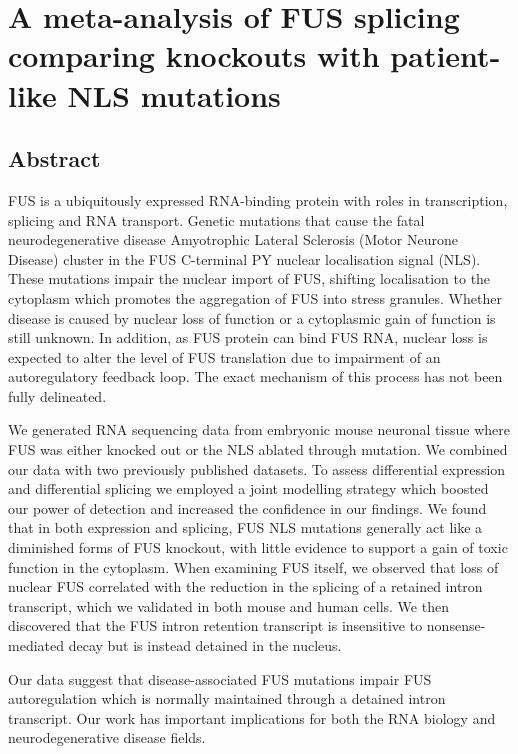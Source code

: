 \chapter{A meta-analysis of FUS splicing comparing knockouts with patient-like NLS mutations}
\label{chapter:fus_meta}

\section{Abstract}

FUS is a ubiquitously expressed RNA-binding protein with roles in transcription, splicing and RNA transport. Genetic mutations that cause the fatal neurodegenerative disease Amyotrophic Lateral Sclerosis (Motor Neurone Disease) cluster in the FUS C-terminal PY nuclear localisation signal (NLS).  These mutations impair the nuclear import of FUS,  shifting localisation to the cytoplasm which promotes the aggregation of FUS into stress granules. Whether disease is caused by nuclear loss of function or  a cytoplasmic gain of function is still unknown. In addition, as FUS protein can bind FUS RNA, nuclear loss is expected to alter the level of FUS translation due to impairment of an autoregulatory feedback loop. The exact mechanism of this process has not been fully delineated.

We generated RNA sequencing data from embryonic mouse neuronal tissue where FUS was either knocked out or the NLS ablated through mutation. We combined our data with two previously published datasets. To assess differential expression and differential splicing we employed a joint modelling strategy which boosted our power of detection and increased the confidence in our findings. We found that in both expression and splicing, FUS NLS mutations generally act like a diminished forms of FUS knockout, with little evidence to support a gain of toxic function in the cytoplasm. When examining FUS itself, we observed that loss of nuclear FUS correlated with the reduction in the splicing of a retained intron transcript, which we validated in both mouse and human cells. We then discovered that the FUS intron retention transcript is insensitive to nonsense-mediated decay but is instead detained in the nucleus.

Our data suggest that disease-associated FUS mutations impair FUS autoregulation which is normally maintained through a detained intron transcript. Our work has important implications for both the RNA biology and neurodegenerative disease fields.




